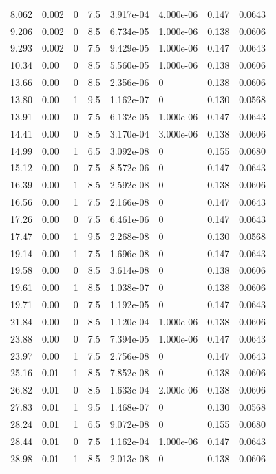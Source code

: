 \documentclass[preview]{standalone}
\begin{document}
{{\begin{tabular}{L{1.2cm}C{1.2cm} C{0.3cm}C{0.5cm} C{1.4cm}C{1.4cm} C{1.4cm}C{1.4cm}}
  8.062  &  0.002  & 0     & 7.5 &  3.917e-04  & 4.000e-06  & 0.147 &  0.0643   \\ 
  9.206  &  0.002  & 0     & 8.5 &  6.734e-05  & 1.000e-06  & 0.138 &  0.0606   \\ 
  9.293  &  0.002  & 0     & 7.5 &  9.429e-05  & 1.000e-06  & 0.147 &  0.0643   \\ 
  10.34  &  0.00  & 0     & 8.5 &  5.560e-05  & 1.000e-06  & 0.138 &  0.0606   \\ 
  13.66  &  0.00  & 0     & 8.5 &  2.356e-06  & 0  & 0.138 &  0.0606   \\ 
  13.80  &  0.00  & 1     & 9.5 &  1.162e-07  & 0  & 0.130 &  0.0568   \\ 
  13.91  &  0.00  & 0     & 7.5 &  6.132e-05  & 1.000e-06  & 0.147 &  0.0643   \\ 
  14.41  &  0.00  & 0     & 8.5 &  3.170e-04  & 3.000e-06  & 0.138 &  0.0606   \\ 
  14.99  &  0.00  & 1     & 6.5 &  3.092e-08  & 0  & 0.155 &  0.0680   \\ 
  15.12  &  0.00  & 0     & 7.5 &  8.572e-06  & 0  & 0.147 &  0.0643   \\ 
  16.39  &  0.00  & 1     & 8.5 &  2.592e-08  & 0  & 0.138 &  0.0606   \\ 
  16.56  &  0.00  & 1     & 7.5 &  2.166e-08  & 0  & 0.147 &  0.0643   \\ 
  17.26  &  0.00  & 0     & 7.5 &  6.461e-06  & 0  & 0.147 &  0.0643   \\ 
  17.47  &  0.00  & 1     & 9.5 &  2.268e-08  & 0  & 0.130 &  0.0568   \\ 
  19.14  &  0.00  & 1     & 7.5 &  1.696e-08  & 0  & 0.147 &  0.0643   \\ 
  19.58  &  0.00  & 0     & 8.5 &  3.614e-08  & 0  & 0.138 &  0.0606   \\ 
  19.61  &  0.00  & 1     & 8.5 &  1.038e-07  & 0  & 0.138 &  0.0606   \\ 
  19.71  &  0.00  & 0     & 7.5 &  1.192e-05  & 0  & 0.147 &  0.0643   \\ 
  21.84  &  0.00  & 0     & 8.5 &  1.120e-04  & 1.000e-06  & 0.138 &  0.0606   \\ 
  23.88  &  0.00  & 0     & 7.5 &  7.394e-05  & 1.000e-06  & 0.147 &  0.0643   \\ 
  23.97  &  0.00  & 1     & 7.5 &  2.756e-08  & 0  & 0.147 &  0.0643   \\ 
  25.16  &  0.01  & 1     & 8.5 &  7.852e-08  & 0  & 0.138 &  0.0606   \\ 
  26.82  &  0.01  & 0     & 8.5 &  1.633e-04  & 2.000e-06  & 0.138 &  0.0606   \\ 
  27.83  &  0.01  & 1     & 9.5 &  1.468e-07  & 0  & 0.130 &  0.0568   \\ 
  28.24  &  0.01  & 1     & 6.5 &  9.072e-08  & 0  & 0.155 &  0.0680   \\ 
  28.44  &  0.01  & 0     & 7.5 &  1.162e-04  & 1.000e-06  & 0.147 &  0.0643   \\ 
  28.98  &  0.01  & 1     & 8.5 &  2.013e-08  & 0  & 0.138 &  0.0606   \\ 
\hline 
\end{tabular} 

}}
\end{document}
